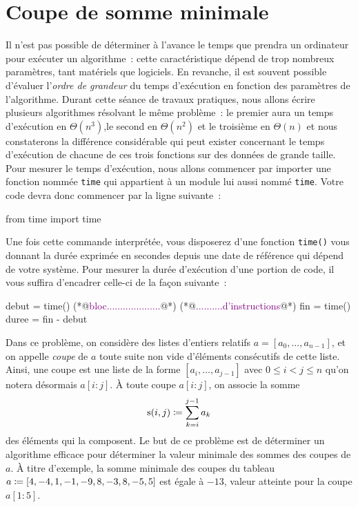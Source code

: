 \documentclass{magnoliaold}
\begin{document}



\section{Coupe de somme minimale}

Il n'est pas possible de déterminer à l'avance le temps que prendra un ordinateur pour exécuter un algorithme~:
cette caractéristique dépend de trop nombreux paramètres, tant matériels que logiciels. En revanche, il est
souvent possible d'évaluer l'\emph{ordre de grandeur} du temps d'exécution en fonction des paramètres de
l'algorithme. Durant cette séance de travaux pratiques, nous allons écrire plusieurs algorithmes résolvant le
même problème~: le premier aura un temps d'exécution en $\Theta(n^3)$,le second en $\Theta(n^2)$ et le troisième
en $\Theta(n)$ et nous constaterons la différence considérable qui peut exister concernant le temps d'exécution
de chacune de ces trois fonctions sur des données de grande taille.\\

Pour mesurer le temps d'exécution, nous allons commencer par importer une fonction nommée \verb!time! qui
appartient à un module lui aussi nommé \verb!time!. Votre code devra donc commencer par la ligne suivante~:
\begin{pythoncode}
from time import time
\end{pythoncode}
Une fois cette commande interprétée, vous disposerez d'une fonction \verb!time()! vous donnant la durée exprimée
en secondes depuis une date de référence qui dépend de votre système. Pour mesurer la durée d'exécution d'une
portion de code, il vous suffira d'encadrer celle-ci de la façon suivante~:
\begin{pythoncode}
debut = time()
(*@\textcolor{purple}{bloc....................}@*)
(*@\textcolor{purple}{..........d'instructions}@*)
fin = time()
duree = fin - debut
\end{pythoncode}

Dans ce problème, on considère des listes d'entiers relatifs $a=[a_0,\ldots,a_{n-1}]$, et on appelle \emph{coupe}
de $a$ toute suite non vide d'éléments consécutifs de cette liste. Ainsi, une coupe est une liste de la forme
$[a_i,\ldots,a_{j-1}]$ avec $0\leq i<j\leq n$ qu'on notera désormais $a[i:j]$. À toute coupe $a[i:j]$, on associe
la somme
\[{\rm s}(i,j)\coloneqq\sum_{k=i}^{j-1} a_k\]
des éléments qui la composent. Le but de ce problème est de déterminer un algorithme efficace pour déterminer
la valeur minimale des sommes des coupes de $a$. À titre d'exemple, la somme minimale des coupes du tableau
$a\coloneqq[4, -4, 1, -1, -9, 8, -3, 8, -5, 5]$ est égale à $-13$, valeur atteinte pour la coupe $a[1:5]$.
\end{document}

